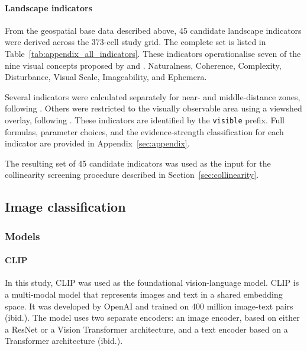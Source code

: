 \documentclass[11pt]{article}
\renewcommand{\_}{\textunderscore\allowbreak{}}
\begin{document}
\paragraph{Landscape indicators}\label{sec:LandscapeIndicators}

From the geospatial base data described above, 45 candidate landscape indicators were derived across the 373-cell study grid. The complete set is listed in Table~\ref{tab:appendix_all_indicators}. These indicators operationalise seven of the nine visual concepts proposed by \citet{tveit_key_2006} and \citet{ode_capturing_2008}. Naturalness, Coherence, Complexity, Disturbance, Visual Scale, Imageability, and Ephemera.

Several indicators were calculated separately for near- and middle-distance zones, following \citet{schirpke_predicting_2013}. Others were restricted to the visually observable area using a viewshed overlay, following \citet{tenerelli_spatial_2017}. These indicators are identified by the \texttt{visible\_} prefix. Full formulas, parameter choices, and the evidence-strength classification for each indicator are provided in Appendix~\ref{sec:appendix}.

The resulting set of 45 candidate indicators was used as the input for the collinearity screening procedure described in Section~\ref{sec:collinearity}.

\subsection{Image classification}\label{sec:ImageClassification}

\subsubsection{Models}

\paragraph{CLIP}
In this study, CLIP \citep{radford_learning_2021} was used as the foundational vision-language model. CLIP is a multi-modal model that represents images and text in a shared embedding space. It was developed by OpenAI and trained on 400 million image-text pairs (ibid.). The model uses two separate encoders: an image encoder, based on either a ResNet or a Vision Transformer architecture, and a text encoder based on a Transformer architecture (ibid.).
\end{document}
